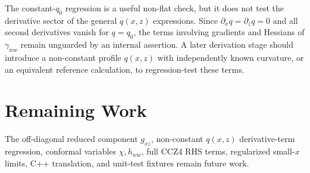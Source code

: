 \documentclass[11pt]{article}
\begin{document}
The constant-\(q_0\) regression is a useful non-flat check, but it does not
test the derivative sector of the general \(q(x,z)\) expressions. Since
\(\partial_x q=\partial_z q=0\) and all second derivatives vanish for
\(q=q_0\), the terms involving gradients and Hessians of \(\gamma_{ww}\)
remain unguarded by an internal assertion. A later derivation stage should
introduce a non-constant profile \(q(x,z)\) with independently known curvature,
or an equivalent reference calculation, to regression-test these terms.

\section{Remaining Work}

The off-diagonal reduced component \(g_{xz}\), non-constant \(q(x,z)\)
derivative-term regression, conformal variables \(\chi,h_{ww}\), full CCZ4 RHS
terms, regularized small-\(x\) limits, C++ translation, and unit-test fixtures
remain future work.
\end{document}
